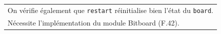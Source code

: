 \documentclass[a4paper,12pt]{article}
\begin{document}
\begin{tabularx}{\textwidth}{|X|}
    On vérifie également que \texttt{restart} réinitialise bien l’état du \texttt{board}.                                                                                                                                                                                       \\
    \arrayrulecolor{MediumAquamarine}\hline
    \arrayrulecolor{CornflowerBlue}
    Nécessite l'implémentation du module Bitboard (F.42).                                                                                                                                                                                                                       \\
    \hline
\end{tabularx}

\vspace{1cm}
\end{document}
